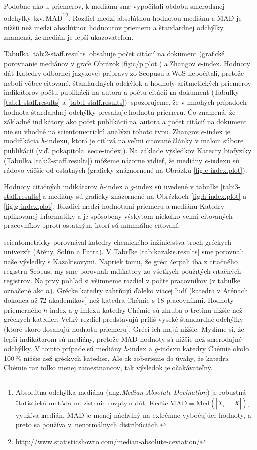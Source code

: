 Podobne ako u priemerov, k mediánu sme vypočítali obdobu smerodanej odchylky
tzv.\,MAD\footnote{Absolútna odchýlka mediánu
(ang.\emph{Median Absolute Devination}) je robustná štatistická metóda na
zistenie rozptylu dát. Keďže $\mathrm{MAD} = \mathrm{Med}(|X_i - \tilde{X}|)$,
využíva medián, MAD je menej náchylný na extrémne vybočujúce hodnoty, a preto
sa používa v~nenormálnych
distribúciách.}\footnote{\url{http://www.statisticshowto.com/median-absolute-deviation/}}.
Rozdiel medzi absolútnou hodnotou mediánu a MAD je nižšií
než medzi absolútnou hodnoutov priemeru a štandardnej odchýlky znamená, že
medián je lepší ukazovateľom.

Tabuľka \ref{tab:2-staff.results} obsahuje počet citácií na dokument (grafické
porovnanie mediánov v grafe Obrázok \ref{fig:c/p.plot}) a Zhangov $e$-index.
Hodnoty dát Katedry odbornej jazykovej prípravy zo Scopusu a WoS nepočítali,
pretože neboli vôbec citované.  štandardných odchýlok a hodnoty aritmetických
priemerov indikátorov počtu publikácií na autora a počtu citácií na dokument
(Tabuľky \ref{tab:1-staff.results} a \ref{tab:1-staff.results}), spozorujeme, že v
mnohých prípadoch hodnota štandardnej odchýlky presahuje hodnotu priemeru.  Čo
znamená, že základné indikátory ako počet publikácií na~autora a počet citácií
na dokument nie su vhodné na scientometrickú analýzu tohoto typu.  Zhangov
$e$-index  je modifikácia $h$-indexu, ktorá je citlivá na veľmi citované články
v malom súbore publikácií (viď. pokapitola \ref{sec:e-index}).  Na základe
výsledkov Katedry biofyziky (Tabuľka \ref{tab:2-staff.results}) môžeme názorne
vidieť, že mediány $e$-indexu sú rádovo väčšie od ostatných (graficky
znáznornené na Obrázku \ref{fig:e-index.plot}).

Hodnoty citačných indikátorov $h$-index a $g$-index sú uvedené v tabuľke
\ref{tab:3-staff.results} a mediány sú graficky znázornené na Obrázkoch
\ref{fig:h-index.plot} a \ref{fig:g-index.plot}.  Rozdiel medzi hodnotami
priemeru a mediánu Katedry aplikovanej informatiky a je spôsobeny výskytom
niekoľko veľmi citovaných pracovníkov oproti ostatným, ktorí sú minimálne
citovaní.

\citet{Kazakis2015} scientometricky porovnával katedry chemického inžinierstva
troch gréckych univerzít (Atény, Solún a Patra).  V Tabuľke
\ref{tab:kazakis.results} sme porovnali naše výsledky s Kazakisovymi. Napriek
tomu, že gréci čerpali iba z citačného registru Scopus, my sme porovnali
indikátory zo všetkých použitých citačných registrov. Na prvý pohľad si
všimneme rozdiel v počte pracovníkov (v tabuľke označené ako $n$).  Grécke
katedry zahrňujú ďaleko viacej ľudí (katedra v Aténach dokonca až 72
akademikov) než katedra Chémie s 18 pracovníkmi.  Hodnoty priemerného $h$-index
a $g$-indexu katedry Chémie sú  zhruba o tretinu nižšie než gréckych katedier.
Veľký rozdiel predstavujú príliš vysoké štandardné odchýlky (ktoré skoro
dosahujú hodnotu priemeru). Gréci ich majú nižšie.  Myslíme si, že lepší
indikátorom sú mediány, pretože MAD hodnoty sú nižšie než smerodajné odchýlky.
V tomto prípade sú mediány $h$-index a $g$-indexu katedry Chémie okolo 100\,\%
nižšie než gréckych katedier. Ale ak zoberieme do úvahy, že katedra Chémie raz
toľko menej zamestnancov, tak výsledok je očakávateľný.

